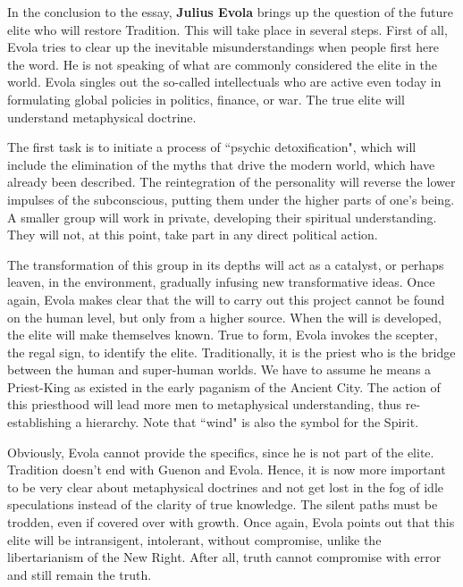\hfill

\begin{quotex}
In the conclusion to the essay, \textbf{Julius Evola} brings up the question of the future elite who will restore Tradition. This will take place in several steps. First of all, Evola tries to clear up the inevitable misunderstandings when people first here the word. He is not speaking of what are commonly considered the elite in the world. Evola singles out the so-called intellectuals who are active even today in formulating global policies in politics, finance, or war. The true elite will understand metaphysical doctrine.

The first task is to initiate a process of ``psychic detoxification", which will include the elimination of the myths that drive the modern world, which have already been described. The reintegration of the personality will reverse the lower impulses of the subconscious, putting them under the higher parts of one's being. A smaller group will work in private, developing their spiritual understanding. They will not, at this point, take part in any direct political action.

The transformation of this group in its depths will act as a catalyst, or perhaps leaven, in the environment, gradually infusing new transformative ideas. Once again, Evola makes clear that the will to carry out this project cannot be found on the human level, but only from a higher source. When the will is developed, the elite will make themselves known. True to form, Evola invokes the scepter, the regal sign, to identify the elite. Traditionally, it is the priest who is the bridge between the human and super-human worlds. We have to assume he means a Priest-King as existed in the early paganism of the Ancient City. The action of this priesthood will lead more men to metaphysical understanding, thus re-establishing a hierarchy. Note that ``wind" is also the symbol for the Spirit.

Obviously, Evola cannot provide the specifics, since he is not part of the elite. Tradition doesn't end with Guenon and Evola. Hence, it is now more important to be very clear about metaphysical doctrines and not get lost in the fog of idle speculations instead of the clarity of true knowledge. The silent paths must be trodden, even if covered over with growth. Once again, Evola points out that this elite will be intransigent, intolerant, without compromise, unlike the libertarianism of the New Right. After all, truth cannot compromise with error and still remain the truth. 

\end{quotex}
